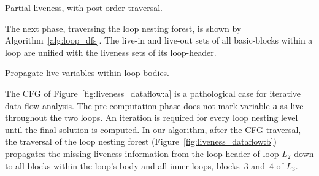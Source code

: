 \begin{algorithm}[H]
  \caption{Partial liveness, with post-order traversal.}
  \label{alg:dag_dfs}
\end{algorithm}

The next phase, traversing the loop nesting forest, is shown by Algorithm~\ref{alg:loop_dfs}.
The live-in and live-out sets of all basic-blocks within a loop are unified with the liveness sets of its loop-header.

\begin{algorithm}[H]
  \caption{Propagate live variables within loop bodies.}
  \label{alg:loop_dfs}
\end{algorithm}

\begin{example}
	The CFG of Figure~\ref{fig:liveness_dataflow:a} is a pathological case for iterative data-flow analysis.
	The pre-computation phase does not mark variable \texttt{a} as live throughout the two loops.
	An iteration is required for every loop nesting level until the final solution is computed.
	In our algorithm, after the CFG traversal, the traversal of the loop nesting forest (Figure~\ref{fig:liveness_dataflow:b}) propagates the missing liveness information from the loop-header of loop $L_2$ down to all blocks within the loop's body and all inner loops, \ie blocks~$3$ and~$4$ of $L_3$.
\end{example}

